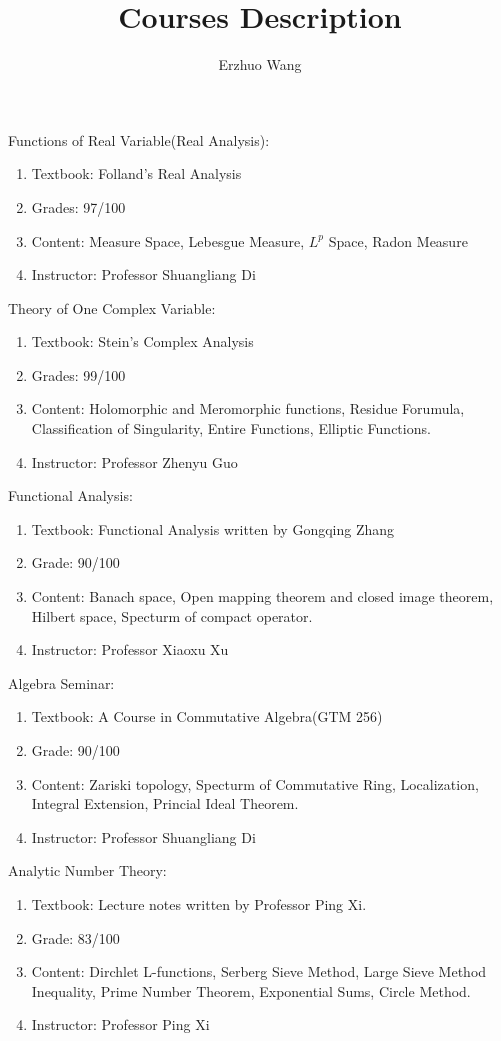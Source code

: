 \documentclass[12pt]{article}
\title{Courses Description}
\author{Erzhuo Wang}
\date{}
\newenvironment{enu}{\begin{enumerate}[(1)]}{\end{enumerate}}
\theoremstyle{definition}
\begin{document}
\maketitle 
Functions of Real Variable(Real Analysis):
\begin{enu}
    \item Textbook: Folland's Real Analysis
    \item Grades: 97/100
    \item Content: Measure Space, Lebesgue Measure, $L^p$ Space, Radon Measure 
    \item Instructor: Professor Shuangliang Di
\end{enu}

Theory of One Complex Variable: 
\begin{enu}
    \item Textbook: Stein's Complex Analysis
    \item Grades: 99/100
    \item Content: Holomorphic and Meromorphic functions, Residue Forumula, 
    Classification of Singularity, Entire Functions, Elliptic Functions. 
    \item Instructor: Professor Zhenyu Guo
\end{enu}

Functional Analysis: 
\begin{enu}
    \item Textbook: Functional Analysis written by Gongqing Zhang
    \item Grade: 90/100
    \item Content: Banach space, Open mapping theorem and closed image theorem, Hilbert space, Specturm of compact operator. 
    \item Instructor: Professor Xiaoxu Xu

\end{enu}

Algebra Seminar: 
\begin{enu}
    \item Textbook: A Course in Commutative Algebra(GTM 256)
    \item Grade: 90/100
    \item Content: Zariski topology, Specturm of Commutative Ring, Localization, Integral Extension, Princial Ideal Theorem.   
    \item Instructor: Professor Shuangliang Di
\end{enu}

Analytic Number Theory: 
\begin{enu}
    \item Textbook: Lecture notes written by Professor Ping Xi. 
    \item Grade: 83/100
    \item Content: Dirchlet L-functions, Serberg Sieve Method, Large Sieve Method Inequality, 
    Prime Number Theorem, Exponential Sums, Circle Method. 
    \item Instructor: Professor Ping Xi
\end{enu}
\end{document}
